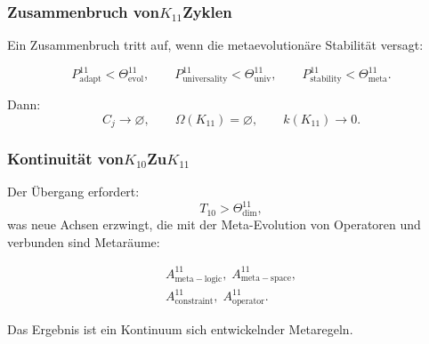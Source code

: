 \subsubsection{Zusammenbruch von$K_{11}$Zyklen}

Ein Zusammenbruch tritt auf, wenn die metaevolutionäre Stabilität versagt:

\[
   P^{11}_{\mathrm{adapt}} < \Theta^{11}_{\mathrm{evol}},\qquad
   P^{11}_{\mathrm{universality}} < \Theta^{11}_{\mathrm{univ}},\qquad
   P^{11}_{\mathrm{stability}} < \Theta^{11}_{\mathrm{meta}}.
\]

Dann:
\[
  C_j\to\varnothing,\qquad
  \Omega(K_{11})=\varnothing,\qquad
  k(K_{11})\to 0.
\]


\subsubsection{Kontinuität von$K_{10}$Zu$K_{11}$}

Der Übergang erfordert:
\[
  T_{10}>\Theta^{11}_{\mathrm{dim}},
\]
was neue Achsen erzwingt, die mit der Meta-Evolution von Operatoren und verbunden sind
Metaräume:

\[
  \begin{aligned}
  A^{11}_{\mathrm{meta\!-\!logic}},\;
  A^{11}_{\mathrm{meta\!-\!space}},\\
  A^{11}_{\mathrm{constraint}},\;
  A^{11}_{\mathrm{operator}}.
  \end{aligned}
\]

Das Ergebnis ist ein Kontinuum sich entwickelnder Metaregeln.
